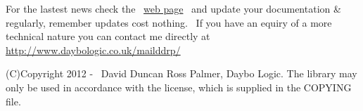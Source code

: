 \documentclass{article}
\begin{document}
\par For the lastest news check the~ \href{http://bitbucket.org/daybologic/dlpodget}{web
page}~ and update your documentation \& regularly,
remember
updates cost nothing.~ If you have an equiry of a more technical
nature
you can contact me directly at \href{http://www.daybologic.co.uk/mailddrp/}{\url{http://www.daybologic.co.uk/mailddrp/}}\href{mailto:palmer@overchat.org}{}


\par (C)Copyright 2012 -
\the\year
~David Duncan Ross Palmer, Daybo Logic. The library may only be used in accordance
with
the license, which is supplied in the COPYING file.\\
\end{document}
